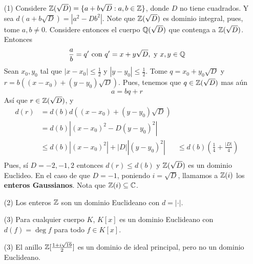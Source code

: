 \begin{example}\label{}
    \begin{enumerate}
        \item[(1)] Considere $\mathbb{Z}(\sqrt{D})=\{a+b\sqrt{D} : a,b \in \mathbb{Z}\}$, donde
            $D$ no tiene cuadrados. Y sea $d(a+b\sqrt{D})=|a^2-Db^2|$. Note
            que $\mathbb{Z}(\sqrt{D})$ es dominio integral, pues, tome $a,b \neq 0$.
            Considere entonces el cuerpo $\mathbb{Q}(\sqrt{D})$ que contenga a
            $\mathbb{Z}(\sqrt{D})$. Entonces
            \begin{equation*}
                \frac{a}{b}=q' \text{ con } q'=x+y\sqrt{D}, \text{ y } x,y \in \mathbb{Q}
            \end{equation*}
            Sean $x_0, y_0$ tal que $|x-x_0| \leq \frac{1}{2}$ y $|y-y_0| \leq
            \frac{1}{2}$. Tome $q=x_0+y_0\sqrt{D}$ y $r=b((x-x_0)+(y-y_0)\sqrt{D})$.
            Pues, tenemos que
            $q \in \mathbb{Z}(\sqrt{D})$ mas a\'un
            \begin{equation*}
                a=bq+r
            \end{equation*}
             As\'i que $r \in \mathbb{Z}(\sqrt{D})$, y
             \begin{align*}
                 d(r)       &= d(b)d((x-x_0)+(y-y_0)\sqrt{D})  \\
                            &= d(b)|(x-x_0)^2-D(y-y_0)^2|   \\
                            & \leq d(b)|(x-x_0)^2|+|D||(y-y_0)^2|
                            & \leq d(b)(\frac{1}{4}+\frac{|D|}{4})  \\
             \end{align*}
             Pues, s\'i $D=-2,-1,2$ entonces $d(r) \leq d(b)$ y $\mathbb{Z}(\sqrt{D})$ es un
             dominio Euclideo. En el caso de que $D=-1$, poniendo  $i=\sqrt{D}$,
             llamamos a $\mathbb{Z}(i)$ los \textbf{enteros Gaussianos}. Nota que $\mathbb{Z}(i)
             \subseteq \mathbb{C}$.

         \item[(2)] Los enteros $\mathbb{Z}$ son un dominio Euclideano con  $d=|\cdot|$.

         \item[(3)] Para cualquier cuerpo $K$, $K[x]$ es un dominio Euclideano
             con $d(f)=\deg{f}$ para todo $f \in K[x]$.

         \item[(3)] El anillo $\mathbb{Z}[\frac{1+i\sqrt{19}}{2}]$ es un dominio de
             ideal principal, pero no un dominio Euclideano.
    \end{enumerate}
\end{example}
